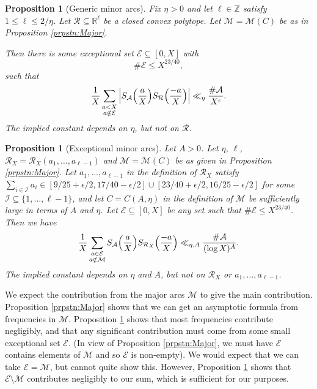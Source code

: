 \documentclass[10pt]{amsart}
\theoremstyle{plain}
\newtheorem{prpstn}[thrm]{Proposition}
\numberwithin{sblmm}{thrm}
\numberwithin{equation}{section}
\begin{document}
%
%
%
%
\begin{prpstn}[Generic minor arcs] \label{prpstn:Generic}
%
Fix $\eta>0$ and let $\ell\in\mathbb{Z}$ satisfy $1\le \ell \le 2/\eta$. Let $\mathcal{R}\subseteq\mathbb{R}^\ell$ be a closed convex polytope. Let $\mathcal{M}=\mathcal{M}(C)$ be as in Proposition \ref{prpstn:Major}.

Then there is some exceptional set $\mathcal{E}\subseteq[0,X]$ with
\[
\#\mathcal{E}\le X^{23/40},
\]
such that
\[
\frac{1}{X}\sum_{\substack{a<X\\ a\notin\mathcal{E}}}\Big|S_\mathcal{A}\Bigl(\frac{a}{X}\Bigr)S_{\mathcal{R}}\Bigl(\frac{-a}{X}\Bigr)\Big|\ll_\eta \frac{\#\mathcal{A}}{X^{\epsilon}}.
\]
The implied constant depends on $\eta$, but not on $\mathcal{R}$.
%
\end{prpstn}
%
%
%
%
\begin{prpstn}[Exceptional minor arcs] \label{prpstn:Exceptional}
%
Let $A>0$. Let $\eta$, $\ell$, $\mathcal{R}_X=\mathcal{R}_X(a_1,\dots,a_{\ell-1})$ and $\mathcal{M}=\mathcal{M}(C)$ be as given in Proposition \ref{prpstn:Major}. Let $a_1,\dots,a_{\ell-1}$ in the definition of $\mathcal{R}_X$ satisfy $\sum_{i\in\mathcal{I}}a_i\in [9/25+\epsilon/2,17/40-\epsilon/2]\cup[23/40+\epsilon/2,16/25-\epsilon/2]$ for some $\mathcal{I}\subseteq\{1,\dots,\ell-1\}$, and let $C=C(A,\eta)$ in the definition of $\mathcal{M}$ be sufficiently large in terms of $A$ and $\eta$. Let $\mathcal{E}\subseteq [0,X]$ be any set such that $\#\mathcal{E}\le X^{23/40}$. Then we have
\[
\frac{1}{X}\sum_{\substack{a\in\mathcal{E}\\ a\notin\mathcal{M}}}S_{\mathcal{A}}\Bigl(\frac{a}{X}\Bigr)S_{\mathcal{R}_X}\Bigl(\frac{-a}{X}\Bigr)\ll_{\eta,A}\frac{\#\mathcal{A}}{(\log{X})^{A}}.
\]
The implied constant depends on $\eta$ and $A$, but not on $\mathcal{R}_X$ or $a_1,\dots,a_{\ell-1}$.
%
\end{prpstn}
%
%
%
%
We expect the contribution from the major arcs $\mathcal{M}$ to give the main contribution. Proposition \ref{prpstn:Major} shows that we can get an asymptotic formula from frequencies in $\mathcal{M}$. Proposition \ref{prpstn:Generic} shows that most frequencies contribute negligibly, and that any significant contribution must come from some small exceptional set $\mathcal{E}$. (In view of Proposition \ref{prpstn:Major}, we must have $\mathcal{E}$ contains elements of $\mathcal{M}$ and so $\mathcal{E}$ is non-empty). We would expect that we can take $\mathcal{E}=\mathcal{M}$, but cannot quite show this. However, Proposition \ref{prpstn:Exceptional} shows that $\mathcal{E}\setminus\mathcal{M}$ contributes negligibly to our sum, which is sufficient for our purposes.
\end{document}

